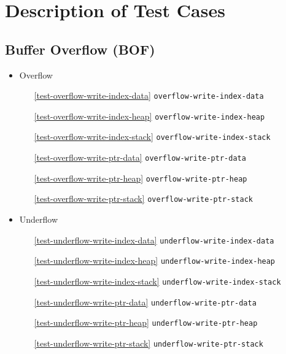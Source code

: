 \documentclass[a4paper]{book}
\begin{document}
\chapter{Description of Test Cases}

\section{Buffer Overflow (BOF)}
\begin{itemize}[noitemsep]

\item Overflow
 \begin{itemize}[noitemsep, nolistsep, leftmargin=1em]
    \item[\ref{test-overflow-write-index-data}]       \texttt{overflow-write-index-data}
    \item[\ref{test-overflow-write-index-heap}]       \texttt{overflow-write-index-heap}
    \item[\ref{test-overflow-write-index-stack}]      \texttt{overflow-write-index-stack}
    \item[\ref{test-overflow-write-ptr-data}]         \texttt{overflow-write-ptr-data}
    \item[\ref{test-overflow-write-ptr-heap}]         \texttt{overflow-write-ptr-heap}
    \item[\ref{test-overflow-write-ptr-stack}]        \texttt{overflow-write-ptr-stack}
 \end{itemize}

\item Underflow
 \begin{itemize}[noitemsep, nolistsep, leftmargin=1em]
    \item[\ref{test-underflow-write-index-data}]      \texttt{underflow-write-index-data}
    \item[\ref{test-underflow-write-index-heap}]      \texttt{underflow-write-index-heap}
    \item[\ref{test-underflow-write-index-stack}]     \texttt{underflow-write-index-stack}
    \item[\ref{test-underflow-write-ptr-data}]        \texttt{underflow-write-ptr-data}
    \item[\ref{test-underflow-write-ptr-heap}]        \texttt{underflow-write-ptr-heap}
    \item[\ref{test-underflow-write-ptr-stack}]       \texttt{underflow-write-ptr-stack}
 \end{itemize}

\end{itemize}
\end{document}
